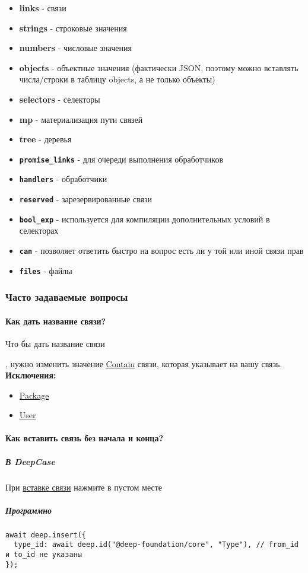 \documentclass{article}
\begin{document}
\begin{itemize}
  \item \textbf{links} - связи
  \item \textbf{strings} - строковые значения
  \item \textbf{numbers} - числовые значения
  \item \textbf{objects} - объектные значения (фактически JSON, поэтому можно
        вставлять числа/строки в таблицу objects, а не только объекты)
  \item \textbf{selectors} - селекторы
  \item \textbf{mp} - материализация пути связей
  \item \textbf{tree} - деревья
  \item \textbf{\texttt{promise\_links}} - для очереди выполнения обработчиков
  \item \textbf{\texttt{handlers}} - обработчики
  \item \textbf{\texttt{reserved}} - зарезервированные связи
  \item \textbf{\texttt{bool\_exp}} - используется для компиляции
        дополнительных условий в селекторах
  \item \textbf{\texttt{can}} - позволяет ответить быстро на вопрос есть ли у
        той или иной связи прав
  \item \textbf{\texttt{files}} - файлы
\end{itemize}

\subsubsection{Часто задаваемые вопросы}
\paragraph{Как дать название связи?}
\hypertarget{FAQ.HowToSetName}{Что бы дать название связи}, нужно изменить
значение \hyperlink{Core.Contain.Description}{Contain} связи, которая указывает на вашу
связь. \\
\textbf{Исключения:}
\begin{itemize}
  \item \hyperlink{Core.Package.Description}{Package}
  \item \hyperlink{Core.Package.Description}{User}
\end{itemize}
\paragraph{Как вставить связь без начала и
  конца?}\hypertarget{FAQ.HowToInsertLinkWithoutFromAndTo}{}
\subparagraph{В DeepCase}
При \hyperlink{DeepCase.InsertLink.Description}{вставке связи} нажмите в пустом месте
\subparagraph{Программно}
\begin{verbatim}
await deep.insert({
  type_id: await deep.id("@deep-foundation/core", "Type"), // from_id и to_id не указаны
});
\end{verbatim}
\end{document}
